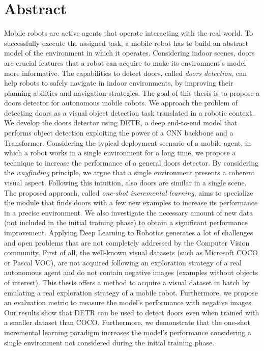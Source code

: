 \newpage
\chapter{Abstract}

Mobile robots are active agents that operate interacting with the real world. To successfully execute the assigned task, a mobile robot has to build an abstract model of the environment in which it operates. Considering indoor scenes, doors are crucial features that a robot can acquire to make its environment's model more informative. The capabilities to detect doors, called \emph{doors detection}, can help robots to safely navigate in indoor environments, by improving their planning abilities and navigation strategies. The goal of this thesis is to propose a doors detector for autonomous mobile robots. We approach the problem of detecting doors as a visual object detection task translated in a robotic context. We develop the doors detector using DETR, a deep end-to-end model that performs object detection exploiting the power of a CNN backbone and a Transformer. Considering the typical deployment scenario of a mobile agent, in which a robot works in a single environment for a long time, we propose a technique to increase the performance of a general doors detector. By considering the \textit{wayfinding} principle, we argue that a single environment presents a coherent visual aspect. Following this intuition, also doors are similar in a single scene. The proposed approach, called \textit{one-shot incremental learning}, aims to specialize the module that finds doors with a few new examples to increase its performance in a precise environment.  We also investigate the necessary amount of new data (not included in the initial training phase) to obtain a significant performance improvement. Applying Deep Learning to Robotics generates a lot of challenges and open problems that are not completely addressed by the Computer Vision community. First of all, the well-known visual datasets (such as Microsoft COCO or Pascal VOC), are not acquired following an exploration strategy of a real autonomous agent and do not contain negative images (examples without objects of interest). This thesis offers a method to acquire a visual dataset in batch by emulating a real exploration strategy of a mobile robot. Furthermore, we propose an evaluation metric to measure the model's performance with negative images. Our results show that DETR can be used to detect doors even when trained with a smaller dataset than COCO. Furthermore, we demonstrate that the one-shot incremental learning paradigm increases the model's performance considering a single environment not considered during the initial training phase.

